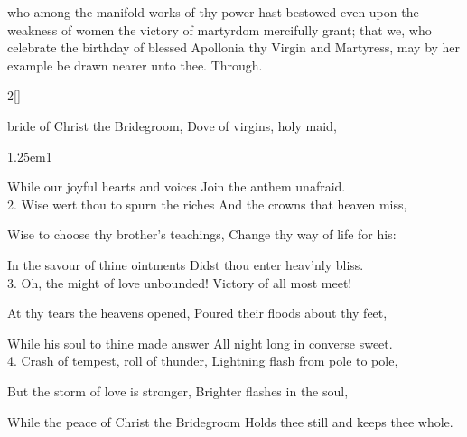 \memorialCollect
{} who among the manifold works of thy power hast bestowed even upon the weakness of women the victory of martyrdom mercifully grant; that we, who celebrate the birthday of blessed Apollonia thy Virgin and Martyress, may by her example be drawn nearer unto thee. Through.


\clearpage
{}

\begin{paracol}{2}[]
\sloppy

\vspace{-1\baselineskip}

\firstEvensong
{}

\firstEvensongHymn\label{ScholasticaEvensong}

 bride of Christ the Bridegroom, Dove of virgins, holy maid,


\begin{hangparas}{1.25em}{1}

While our joyful hearts and voices Join the anthem unafraid.\\

2. Wise wert thou to spurn the riches And the crowns that heaven miss,

Wise to choose thy brother's teachings, Change thy way of life for his:

In the savour of thine ointments Didst thou enter heav'nly bliss.\\

3. Oh, the might of love unbounded! Victory of all most meet!

At thy tears the heavens opened, Poured their floods about thy feet,

While his soul to thine made answer All night long in converse sweet.\\

4. Crash of tempest, roll of thunder, Lightning flash from pole to pole,

But the storm of love is stronger, Brighter flashes in the soul,

While the peace of Christ the Bridegroom Holds thee still and keeps thee whole.\\


\end{hangparas}
\end{paracol}
